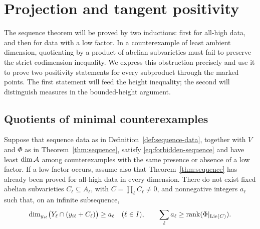 \section{Projection and tangent positivity}
\label{sec:tangent}

The sequence theorem will be proved by two inductions: first for
all-high data, and then for data with a low factor. In a counterexample
of least ambient dimension, quotienting by a product of abelian
subvarieties must fail to preserve the strict codimension inequality.
We express this obstruction precisely and use it to prove two
positivity statements for every subproduct through the marked points.
The first statement will feed the height inequality; the second will
distinguish measures in the bounded-height argument.

\subsection{Quotients of minimal counterexamples}

\begin{lemma}
\label{lemma:projection}
Suppose that sequence data as in Definition~\ref{def:sequence-data},
together with $V$ and $\Phi$ as in Theorem~\ref{thm:sequence}, satisfy
\eqref{eq:forbidden-sequence} and have least $\dim\mathcal A$ among
counterexamples with the same presence or absence of a low factor.
If a low factor occurs, assume also that Theorem~\ref{thm:sequence}
has already been proved for all-high data in every dimension.
There do not exist fixed abelian subvarieties
$C_\ell\subseteq A_\ell$, with $C=\prod_\ell C_\ell\ne0$,
and nonnegative integers $a_\ell$ such that, on an infinite
subsequence,
\begin{equation}
 \label{eq:projection-obstruction}
 \dim_{y_{i\ell}}\bigl(Y_\ell\cap(y_{i\ell}+C_\ell)\bigr)
 \ge a_\ell\quad(\ell\in I),
 \qquad
 \sum_\ell a_\ell\ge\operatorname{rank}(\Phi|_{\operatorname{Lie}(C)}).
\end{equation}
\end{lemma}

